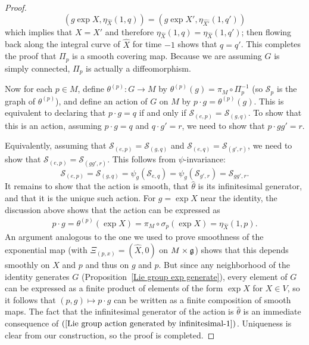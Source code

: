 \begin{proof}
\[(g\exp X,\eta_{\widehat{X}}(1,q))=(g\exp X',\eta_{\widehat{X'}}(1,q'))\]
which implies that $X=X'$ and therefore $\eta_{\widehat{X}}(1,q)=\eta_{\widehat{X}}(1,q')$; then flowing back along the integral curve of $\widehat{X}$ for time $-1$ shows that $q=q'$. This completes the proof that $\Pi_p$ is a smooth covering map. Because we are assuming $G$ is simply connected, $\Pi_p$ is actually a diffeomorphism.\par
Now for each $p\in M$, define $\theta^{(p)}:G\to M$ by $\theta^{(p)}(g)=\pi_M\circ\Pi_p^{-1}$ (so $\mathcal{S}_p$ is the graph of $\theta^{(p)}$), and define an action of $G$ on $M$ by $p\cdot g=\theta^{(p)}(g)$. This is
equivalent to declaring that $p\cdot g=q$ if and only if $\mathcal{S}_{(e,p)}=\mathcal{S}_{(g,q)}$. To show that this is an action, assuming $p\cdot g=q$ and $q\cdot g'=r$, we need to show that $p\cdot gg'=r$.\par
Equivalently, assuming that $\mathcal{S}_{(e,p)}=\mathcal{S}_{(g,q)}$ and $\mathcal{S}_{(e,q)}=\mathcal{S}_{(g',r)}$, we need to show that $\mathcal{S}_{(e,p)}=\mathcal{S}_{(gg',r)}$. This follows from $\psi$-invariance:
\[\mathcal{S}_{(e,p)}=\mathcal{S}_{(g,q)}=\psi_g(\mathcal{S}_{e,q})=\psi_g(\mathcal{S}_{g',r})=\mathcal{S}_{gg',r}.\]
It remains to show that the action is smooth, that $\widehat{\theta}$ is its infinitesimal generator, and that it is the unique such action. For $g=\exp X$ near the identity, the discussion above shows that the action can be expressed as
\begin{align}\label{Lie group action generated by infinitesimal-1}
p\cdot g=\theta^{(p)}(\exp X)=\pi_M\circ\sigma_p(\exp X)=\eta_{\widehat{X}}(1,p).
\end{align}
An argument analogous to the one we used to prove smoothness of the exponential map (with $\varXi_{(p,x)}=(\widehat{X},0)$ on $M\times\mathfrak{g}$) shows that this depends smoothly on $X$ and $p$ and thus on $g$ and $p$. But since any neighborhood of the identity generates $G$ (Proposition~\ref{Lie group exp generate}), every element of $G$ can be expressed as a finite product of elements of the form $\exp X$ for $X\in V$, so it follows that $(p,g)\mapsto p\cdot g$ can be written as a finite composition of smooth maps. The fact that the infinitesimal generator of the action is $\widehat{\theta}$ is an immediate consequence of $(\ref{Lie group action generated by infinitesimal-1})$. Uniqueness is clear from our construction, so the proof is completed.
\end{proof}
